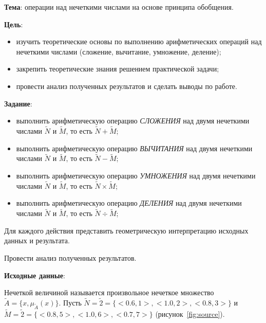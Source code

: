 


\newcommand{\labnumber}{5} %



\usepackage{systeme}
\usepackage{longtable,tabu}
\usepackage{multirow}
\usepackage{array,multirow}
\usepackage{pdflscape}
\usepackage{afterpage}
\usepackage{tikz}
\usepackage{bm}

\graphicspath{{figures/}}


\Russian


\addtocounter{page}{1}

\textbf{Тема}: операции над нечеткими числами на основе принципа обобщения.

\textbf{Цель}: 
\begin{itemize}
	\item изучить теоретические основы по выполнению арифметических операций над нечеткими числами (сложение, вычитание, умножение, деление);
	\item закрепить теоретические знания решением практической задачи;
	\item провести анализ полученных результатов и сделать выводы по работе.
\end{itemize}

\textbf{Задание}: 
\begin{itemize}
	\item выполнить арифметическую операцию \textit{СЛОЖЕНИЯ} над двумя нечеткими числами $\tilde{N}$ и $\tilde{M}$, то есть $\tilde{N}+\tilde{M}$;
	\item выполнить арифметическую операцию \textit{ВЫЧИТАНИЯ} над двумя нечеткими числами $\tilde{N}$ и $\tilde{M}$, то есть $\tilde{N}-\tilde{M}$;
	\item выполнить арифметическую операцию \textit{УМНОЖЕНИЯ} над двумя нечеткими числами $\tilde{N}$ и $\tilde{M}$, то есть $\tilde{N} \times \tilde{M}$;
	\item выполнить арифметическую операцию \textit{ДЕЛЕНИЯ} над двумя нечеткими числами $\tilde{N}$ и $\tilde{M}$, то есть $\tilde{N} \div \tilde{M}$;
\end{itemize}

Для каждого действия представить геометрическую интерпретацию исходных данных и результата.

Провести анализ полученных результатов.

\textbf{Исходные данные}: 

Нечеткой величиной называется произвольное нечеткое множество $\tilde{A} = \{x, \mu_{\tilde{A}} (x)\}$. 
Пусть $\tilde{N} = \tilde{2} = \{ <0.6, 1>, <1.0, 2>, <0.8, 3> \}$ и $\tilde{M} = \tilde{2} = \{ <0.8, 5>, <1.0, 6>, <0.7, 7> \}$ (рисунок~\ref{fig:source}).

